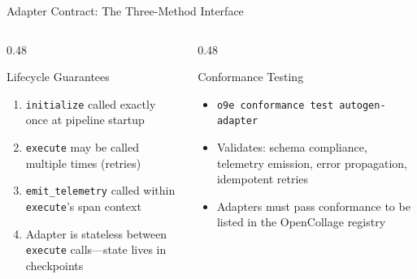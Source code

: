 \begin{frame}[fragile]{Adapter Contract: The Three-Method Interface}
  \vspace{0.1cm}

  \begin{columns}[T]
    \begin{column}{0.48\textwidth}
      \begin{exampleblock}{\scriptsize Lifecycle Guarantees}
        \fontsize{5.5}{6.5}\selectfont
        \begin{enumerate}
          \setlength{\itemsep}{0pt}
          \item \texttt{initialize} called exactly once at pipeline startup
          \item \texttt{execute} may be called multiple times (retries)
          \item \texttt{emit\_telemetry} called within \texttt{execute}'s span context
          \item Adapter is stateless between \texttt{execute} calls---state lives in checkpoints
        \end{enumerate}
      \end{exampleblock}
    \end{column}
    \begin{column}{0.48\textwidth}
      \begin{alertblock}{\scriptsize Conformance Testing}
        \fontsize{5.5}{6.5}\selectfont
        \begin{itemize}
          \setlength{\itemsep}{0pt}
          \item \texttt{o9e conformance test autogen-adapter}
          \item Validates: schema compliance, telemetry emission, error propagation, idempotent retries
          \item Adapters must pass conformance to be listed in the OpenCollage registry
        \end{itemize}
      \end{alertblock}
    \end{column}
  \end{columns}
\end{frame}
